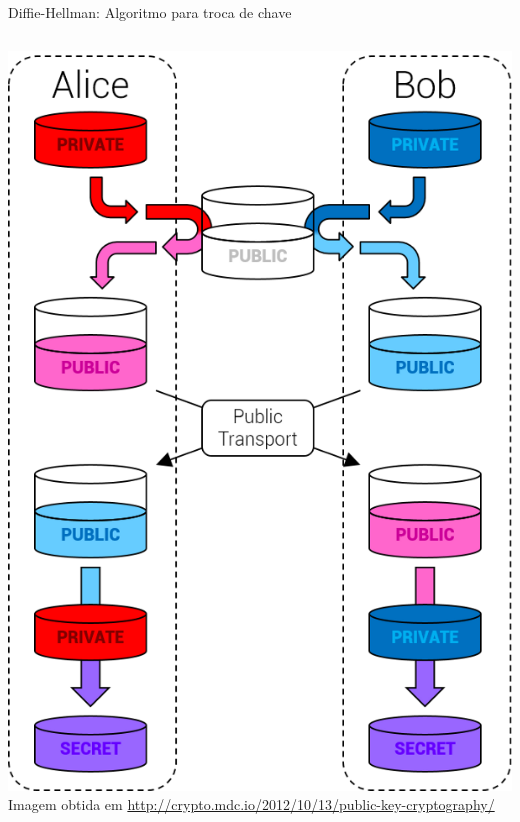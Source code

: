 \documentclass[utf8]{beamer}
\begin{document}
\begin{frame}[fragile]{Diffie-Hellman:
                       Algoritmo para troca de chave}
  \begin{columns}[c]
    \vspace*{-1em}
    \begin{center}
      \includegraphics[height=.85\textheight]{diffie-hellman-paint.png}
      \fontsize{8pt}{8pt}\selectfont
      Imagem obtida em
      \url{http://crypto.mdc.io/2012/10/13/public-key-cryptography/}
    \end{center}
\end{columns}
\end{frame}
\end{document}
